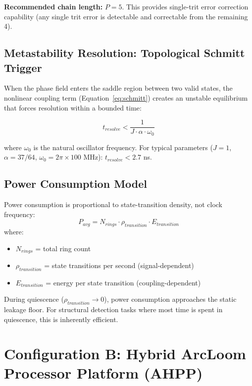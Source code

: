 \documentclass[11pt, a4paper]{article}
\begin{document}
\textbf{Recommended chain length:} $P = 5$. This provides single-trit
error correction capability (any single trit error is detectable and
correctable from the remaining 4).

\subsection{Metastability Resolution: Topological Schmitt Trigger}

When the phase field enters the saddle region between two valid states,
the nonlinear coupling term (Equation~\ref{eq:schmitt}) creates an
unstable equilibrium that forces resolution within a bounded time:

\begin{equation}
  t_{resolve} < \frac{1}{J \cdot \alpha \cdot \omega_0}
\end{equation}

where $\omega_0$ is the natural oscillator frequency. For typical parameters
($J = 1$, $\alpha = 37/64$, $\omega_0 = 2\pi \times 100\text{ MHz}$):
$t_{resolve} < 2.7$ ns.

\subsection{Power Consumption Model}

Power consumption is proportional to state-transition density, not clock
frequency:
\begin{equation}
  P_{avg} = N_{rings} \cdot \rho_{transition} \cdot E_{transition}
\end{equation}
where:
\begin{itemize}[nosep]
  \item $N_{rings}$ = total ring count
  \item $\rho_{transition}$ = state transitions per second (signal-dependent)
  \item $E_{transition}$ = energy per state transition (coupling-dependent)
\end{itemize}

During quiescence ($\rho_{transition} \to 0$), power consumption approaches
the static leakage floor. For structural detection tasks where most time
is spent in quiescence, this is inherently efficient.

\section{Configuration B: Hybrid ArcLoom Processor Platform (AHPP)}
\end{document}
